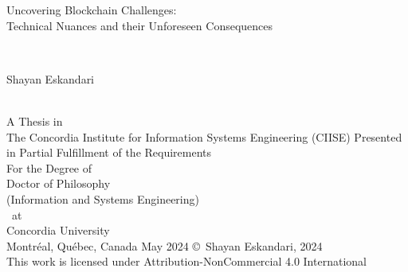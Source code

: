 
\thispagestyle{empty} %

\begin{center} 
\begin{Large} Uncovering Blockchain Challenges: \\ Technical Nuances and their Unforeseen Consequences\end{Large}\\[3em]
\begin{large} Shayan Eskandari \end{large}\\
\vfill
A Thesis in\\
The Concordia Institute for Information Systems Engineering (CIISE)
\vfill
Presented in Partial Fulfillment of the Requirements\\
For the Degree of\\
Doctor of Philosophy\\ 
(Information and Systems Engineering)\\~at\\
Concordia University\\
Montr\'{e}al, Qu\'{e}bec, Canada
\vfill
May 2024 
\vfill
\copyright~Shayan Eskandari, 2024\\
This work is licensed under Attribution-NonCommercial 4.0 International
\end{center}

